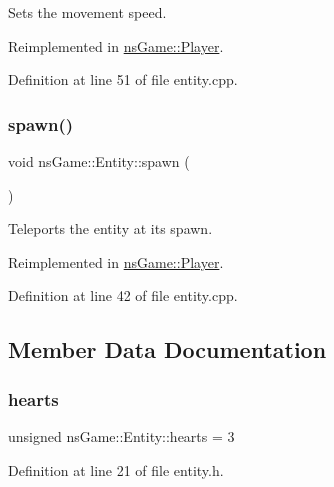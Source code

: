Sets the movement speed. 



Reimplemented in \hyperlink{classns_game_1_1_player_ac3861ee9b9f4a8bedcc6f002ab70e39c}{ns\+Game\+::\+Player}.



Definition at line 51 of file entity.\+cpp.

\mbox{\label{classns_game_1_1_entity_ac09f45ca50c9fef57a50c4414fc7e20d}} 
\subsubsection{\texorpdfstring{spawn()}{spawn()}}
{\footnotesize\ttfamily void ns\+Game\+::\+Entity\+::spawn (\begin{DoxyParamCaption}{ }\end{DoxyParamCaption})\hspace{0.3cm}{\ttfamily [virtual]}}



Teleports the entity at its spawn. 



Reimplemented in \hyperlink{classns_game_1_1_player_aa689f9928e911480b23b00c654cd48f8}{ns\+Game\+::\+Player}.



Definition at line 42 of file entity.\+cpp.



\subsection{Member Data Documentation}
\mbox{\label{classns_game_1_1_entity_a1e6e0c4a54bb2ce22f2c5f2a646b08fe}} 
\subsubsection{\texorpdfstring{hearts}{hearts}}
{\footnotesize\ttfamily unsigned ns\+Game\+::\+Entity\+::hearts = 3}



Definition at line 21 of file entity.\+h.

\mbox{\label{classns_game_1_1_entity_a2b5d83f01bdc1d58673b3fae9afe704e}} 
